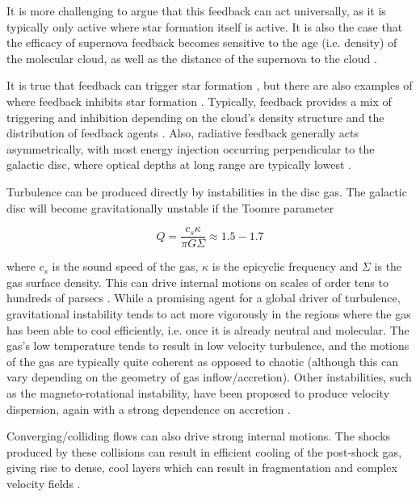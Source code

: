 \documentclass[a4paper,fleqn,usenatbib]{mnras}
\begin{document}
It is more challenging to argue that this feedback can act universally, as it is typically only active where star formation itself is active.  It is also the case that the efficacy of supernova feedback becomes sensitive to the age (i.e. density) of the molecular cloud, as well as the distance of the supernova to the cloud \citep{Ibanez-Mejia2017,Seifried2018}.

It is true that feedback can trigger star formation \citep[e.g.][]{Bisbas2011}, but there are also examples of where feedback inhibits star formation \citep{Lucas2017}.   Typically, feedback provides a mix of triggering and inhibition depending on the cloud's density structure and the distribution of feedback agents \citep{Dale2007a,Dale2014}.  Also, radiative feedback generally acts asymmetrically, with most energy injection occurring perpendicular to the galactic disc, where optical depths at long range are typically lowest \citep{Henley2010}.

Turbulence can be produced directly by instabilities in the disc gas.  The galactic disc will become gravitationally unstable if the Toomre parameter 

\begin{equation}
Q = \frac{c_s \kappa }{\pi G \Sigma} \approx 1.5-1.7
\end{equation}

\noindent where $c_s$ is the sound speed of the gas, $\kappa$ is the epicyclic frequency and $\Sigma$ is the gas surface density. This can drive internal motions on scales of order tens to hundreds of parsecs \citep[see e.g.][]{Goldbaum2015}.  While a promising agent for a global driver of turbulence, gravitational instability tends to act more vigorously in the regions where the gas has been able to cool efficiently, i.e. once it is already neutral and molecular.  The gas's low temperature tends to result in low velocity turbulence, and the motions of the gas are typically quite coherent as opposed to chaotic (although this can vary depending on the geometry of gas inflow/accretion).  Other instabilities, such as the magneto-rotational instability, have been proposed to produce velocity dispersion, again with a strong dependence on accretion \citep{Klessen2010}.

Converging/colliding flows can also drive strong internal motions.  The shocks produced by these collisions can result in efficient cooling of the post-shock gas, giving rise to dense, cool layers which can result in fragmentation and complex velocity fields \citep{BallesterosParedes1999,Heitsch2006,Wu2018}.  
\end{document}
